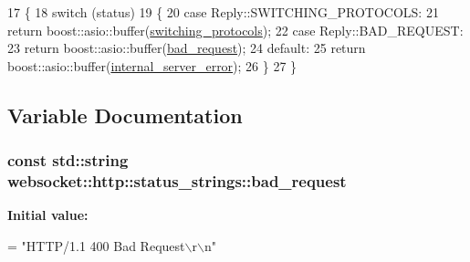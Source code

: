 \begin{DoxyCode}
17             \{
18                 \textcolor{keywordflow}{switch} (status)
19                 \{
20                 \textcolor{keywordflow}{case} Reply::SWITCHING\_PROTOCOLS:
21                     \textcolor{keywordflow}{return} boost::asio::buffer(\hyperlink{namespacewebsocket_1_1http_1_1status__strings_a9b60f1719697fb464b7063cb436e1d75}{switching\_protocols});
22                 \textcolor{keywordflow}{case} Reply::BAD\_REQUEST:
23                     \textcolor{keywordflow}{return} boost::asio::buffer(\hyperlink{namespacewebsocket_1_1http_1_1status__strings_a29073784a5e6444e93b0925153605222}{bad\_request});
24                 \textcolor{keywordflow}{default}:
25                     \textcolor{keywordflow}{return} boost::asio::buffer(\hyperlink{namespacewebsocket_1_1http_1_1status__strings_a364b430d5e52bc7600da0bcc5dc0d5fc}{internal\_server\_error});
26                 \}
27             \}
\end{DoxyCode}


\subsection{Variable Documentation}
\subsubsection[{\texorpdfstring{bad\+\_\+request}{bad_request}}]{\setlength{\rightskip}{0pt plus 5cm}const std\+::string websocket\+::http\+::status\+\_\+strings\+::bad\+\_\+request}\hypertarget{namespacewebsocket_1_1http_1_1status__strings_a29073784a5e6444e93b0925153605222}{}\label{namespacewebsocket_1_1http_1_1status__strings_a29073784a5e6444e93b0925153605222}
{\bfseries Initial value\+:}
\begin{DoxyCode}
=
                \textcolor{stringliteral}{"HTTP/1.1 400 Bad Request\(\backslash\)r\(\backslash\)n"}
\end{DoxyCode}
